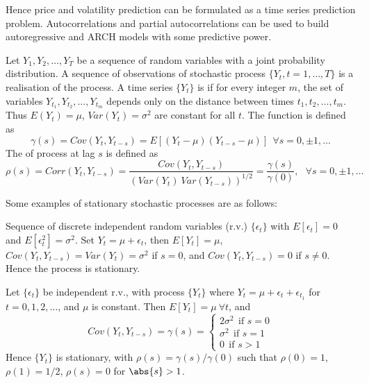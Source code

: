 Hence price and volatility prediction can be formulated as a time series prediction problem. Autocorrelations and partial autocorrelations can be used to build autoregressive and ARCH models with some predictive power.

Let $Y_1, Y_2, \ldots, Y_T$ be a sequence of random variables with a joint probability distribution. A sequence of observations of stochastic process $\{Y_t, t = 1, \ldots, T\}$ is a realisation of the process.
A time series $\{Y_t\}$ is  if for every integer $m$, the set of variables $Y_{t_1}, Y_{t_2}, \ldots, Y_{t_m}$ depends only on the distance between times $t_1, t_2, \ldots, t_m$. Thus $E(Y_t) = \mu$, $Var(Y_t) = \sigma^2$ are constant for all $t$.
The  function is defined as
\begin{equation*}
\gamma(s) = Cov(Y_t, Y_{t-s}) = E[(Y_t - \mu)(Y_{t-s} - \mu)] \ \ \forall s = 0, \pm 1, \ldots \nonumber
\end{equation*}
The  of process at lag $s$ is defined as
\begin{equation*}
\rho(s) = Corr(Y_t, Y_{t-s}) = \frac{Cov(Y_t, Y_{t-s})}{\left(Var(Y_t) \ Var(Y_{t-s}) \right)^{1/2}} = \frac{\gamma(s)}{\gamma(0)}, \ \ \ \forall s = 0, \pm 1, \ldots \nonumber
\end{equation*}

Some examples of stationary stochastic processes are as follows:

\begin{example}  Sequence of discrete independent random variables (r.v.) $\{\epsilon_t \}$ with $E[\epsilon_t] = 0$ and $E[\epsilon_t^2] = \sigma^2$. Set $Y_t = \mu + \epsilon_t$, then $E[Y_t] = \mu$, $Cov(Y_t, Y_{t-s}) = Var(Y_t) = \sigma^2$ if $s=0$, and $Cov(Y_t, Y_{t-s}) = 0$ if $s \neq 0$. Hence the process is stationary.
\end{example}

\begin{example}  Let $\{\epsilon_t\}$ be independent r.v., with process $\{Y_t\}$ where $Y_t = \mu + \epsilon_t + \epsilon_{t_1}$ for $t = 0, 1, 2, \ldots$, and $\mu$ is constant. Then $E[Y_t] = \mu \ \forall t$, and
\begin{equation*}
Cov(Y_t, Y_{t-s}) = \gamma(s) = 
\begin{cases}
2 \sigma^2 \ \ \text{if } s = 0 \\
\sigma^2 \ \ \text{if } s = 1 \\
0 \ \ \text{if } s > 1
\end{cases} \nonumber
\end{equation*}
Hence $\{Y_t\}$ is stationary, with $\rho(s) = \gamma(s) / \gamma(0)$ such that $\rho(0) = 1$, $\rho(1) = 1/2$, $\rho(s) = 0$ for $\abs{s} > 1$.
\end{example}

